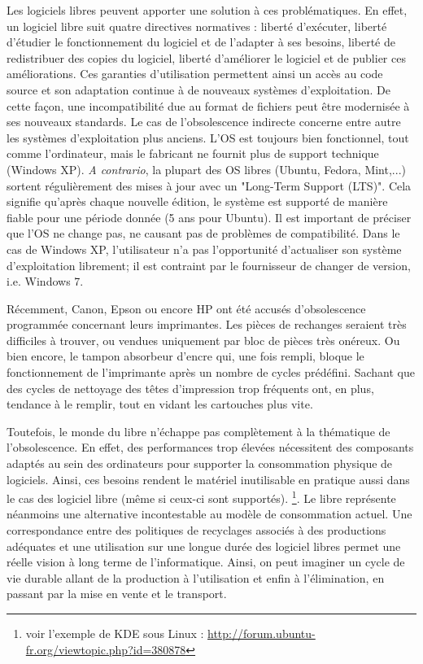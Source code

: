 \documentclass[10pt]{../fiche}
\begin{document}
Les logiciels libres peuvent apporter une solution à ces problématiques. En effet, un logiciel libre suit quatre directives normatives : liberté d'exécuter, liberté d'étudier le fonctionnement du logiciel et de l'adapter à ses besoins, liberté de redistribuer des copies du logiciel, liberté d'améliorer le logiciel et de publier ces améliorations. Ces garanties d'utilisation permettent ainsi un accès au code source et son adaptation continue à de nouveaux systèmes d'exploitation. De cette façon, une incompatibilité due au format de fichiers peut être modernisée à ses nouveaux standards. Le cas de l'obsolescence indirecte concerne entre autre les systèmes d'exploitation plus anciens. L'OS est toujours bien fonctionnel, tout comme l'ordinateur, mais le fabricant ne fournit plus de support technique (\textsf{Windows XP}). \textit{A contrario}, la plupart des OS libres (\textsf{Ubuntu, Fedora, Mint,...}) sortent régulièrement des mises à jour avec un "Long-Term Support (LTS)". Cela signifie qu'après chaque nouvelle édition, le système est supporté de manière fiable pour une période donnée (5 ans pour \textsf{Ubuntu}). Il est important de préciser que l'OS ne change pas, ne causant pas de problèmes de compatibilité. Dans le cas de \textsf{Windows XP}, l'utilisateur n'a pas l'opportunité d'actualiser son système d'exploitation librement; il est contraint par le fournisseur de changer de version, i.e. \textsf{Windows 7}.

Récemment, Canon, Epson ou encore HP ont été accusés d'obsolescence programmée concernant leurs imprimantes. Les pièces de rechanges seraient très difficiles à trouver, ou vendues uniquement par bloc de pièces très onéreux. Ou bien encore, le tampon absorbeur d'encre qui, une fois rempli, bloque le fonctionnement de l'imprimante après un nombre de cycles prédéfini. Sachant que des cycles de nettoyage des têtes d'impression trop fréquents ont, en plus, tendance à le remplir, tout en vidant les cartouches plus vite.

Toutefois, le monde du libre n'échappe pas complètement à la thématique de l'obsolescence. En effet, des performances trop élevées nécessitent des composants adaptés au sein des ordinateurs pour supporter la consommation physique de logiciels. Ainsi, ces besoins rendent le matériel inutilisable en pratique aussi dans le cas des logiciel libre (même si ceux-ci sont supportés). \footnote{voir l'exemple de \textsf{KDE} sous \textsf{Linux} : \url{http://forum.ubuntu-fr.org/viewtopic.php?id=380878}}. Le libre représente néanmoins une alternative incontestable au modèle de consommation actuel. Une correspondance entre des politiques de recyclages associés à des productions adéquates et une utilisation sur une longue durée des logiciel libres permet une réelle vision à long terme de l'informatique. Ainsi, on peut imaginer un cycle de vie durable allant de la production à l'utilisation et enfin à l'élimination, en passant par la mise en vente et le transport.
\end{document}
